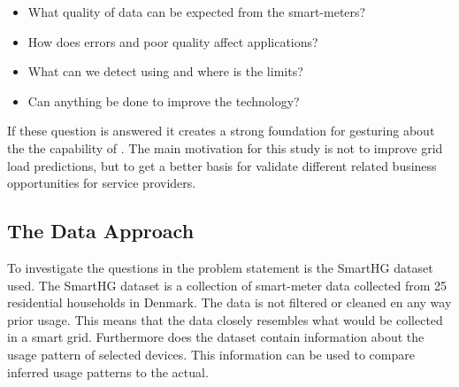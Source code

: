 \begin{itemize}
\item	What quality of data can be expected from the smart-meters?\\
	
\item	How does errors and poor quality affect  applications?\\
	
\item	What can we detect using   and where is the limits? \\
	
\item	Can anything be done to improve the  technology?
\end{itemize}
If these question is answered it creates a strong foundation for gesturing about the the capability of . The main motivation for this study is not to improve grid load predictions, but to get a better basis for validate different  related business opportunities for service providers. 

\subsection{The Data Approach}
To investigate the questions in the problem statement is the SmartHG dataset used. The SmartHG dataset is a collection of smart-meter data collected from 25 residential households in Denmark. The data is not filtered or cleaned en any way prior usage. This means that the data closely resembles what would be collected in a smart grid. Furthermore does the dataset contain information about the usage pattern of selected devices. This information can be used to compare inferred usage patterns to the actual. 
